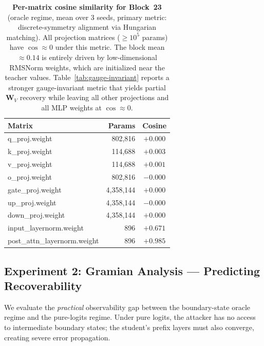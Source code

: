 \documentclass{article}
\newcommand{\bW}{\mathbf{W}}
\begin{document}
\begin{table}[t]
\centering
\caption{\textbf{Per-matrix cosine similarity for Block~23} (oracle regime, mean over 3 seeds, primary metric: discrete-symmetry alignment via Hungarian matching).  All projection matrices ($\geq 10^5$ params) have $\cos \approx 0$ under this metric.  The block mean $\approx 0.14$ is entirely driven by low-dimensional RMSNorm weights, which are initialized near the teacher values.  Table~\ref{tab:gauge-invariant} reports a stronger gauge-invariant metric that yields partial $\bW_V$ recovery while leaving all other projections and all MLP weights at $\cos \approx 0$.}
\label{tab:per-matrix-main}
\small
\begin{tabular}{@{}l r c@{}}
\toprule
\textbf{Matrix} & \textbf{Params} & \textbf{Cosine} \\
\midrule
q\_proj.weight & 802,816 & $+0.000$ \\
k\_proj.weight & 114,688 & $+0.003$ \\
v\_proj.weight & 114,688 & $+0.001$ \\
o\_proj.weight & 802,816 & $-0.000$ \\
gate\_proj.weight & 4,358,144 & $+0.000$ \\
up\_proj.weight & 4,358,144 & $-0.000$ \\
down\_proj.weight & 4,358,144 & $+0.000$ \\
\midrule
input\_layernorm.weight & 896 & $+0.671$ \\
post\_attn\_layernorm.weight & 896 & $+0.985$ \\
\bottomrule
\end{tabular}
\end{table}

\subsection{Experiment 2: Gramian Analysis --- Predicting Recoverability}
\label{sec:exp2}

We evaluate the \emph{practical} observability gap between the boundary-state oracle regime and the pure-logits regime.  Under pure logits, the attacker has no access to intermediate boundary states; the student's prefix layers must also converge, creating severe error propagation.
\end{document}
